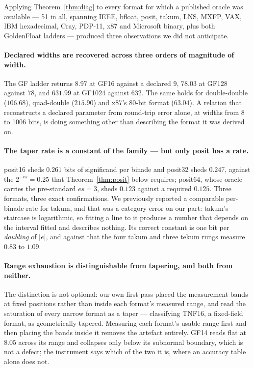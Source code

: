 \documentclass[11pt]{article}
\theoremstyle{definition}
\begin{document}
Applying Theorem~\ref{thm:diag} to every format for which a published oracle was
available --- 51 in all, spanning IEEE, bfloat, posit, takum, LNS, MXFP, VAX, IBM
hexadecimal, Cray, PDP-11, x87 and Microsoft binary, plus both GoldenFloat ladders
--- produced three observations we did not anticipate.

\paragraph{Declared widths are recovered across three orders of magnitude of
width.} The GF ladder returns $8.97$ at GF16 against a declared 9, $78.03$ at
GF128 against 78, and $631.99$ at GF1024 against 632. The same holds for
double-double ($106.68$), quad-double ($215.90$) and x87's 80-bit format
($63.04$). A relation that reconstructs a declared parameter from round-trip error
alone, at widths from 8 to 1006 bits, is doing something other than describing the
format it was derived on.

\paragraph{The taper rate is a constant of the family --- but only posit has a
rate.} posit16 sheds $0.261$ bits of significand per binade and posit32 sheds
$0.247$, against the $2^{-es} = 0.25$ that Theorem~\ref{thm:posit} below requires;
posit64, whose oracle carries the pre-standard $es = 3$, sheds $0.123$ against a
required $0.125$. Three formats, three exact confirmations. We previously reported
a comparable per-binade rate for takum, and that was a category error on our part:
takum's staircase is logarithmic, so fitting a line to it produces a number that
depends on the interval fitted and describes nothing. Its correct constant is one
bit per \emph{doubling} of $|e|$, and against that the four takum and three tekum
rungs measure $0.83$ to $1.09$.

\paragraph{Range exhaustion is distinguishable from tapering, and both from
neither.} The distinction is not optional: our own first pass placed the
measurement bands at fixed positions rather than inside each format's measured
range, and read the saturation of every narrow format as a taper --- classifying
TNF16, a fixed-field format, as geometrically tapered. Measuring each format's
usable range first and then placing the bands inside it removes the artefact
entirely. GF14 reads flat at $8.05$ across its range and collapses only below its
subnormal boundary, which is not a defect; the instrument says which of the two it
is, where an accuracy table alone does not.
\end{document}
